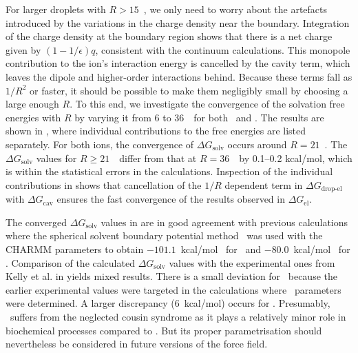 For larger droplets with $R > 15$~\angs, we only need to worry about the artefacts introduced by the 
variations in the charge density near the boundary. Integration of the charge density at the boundary 
region shows that there is a net charge given by $(1-1/\epsilon)q$, consistent with the continuum 
calculations. This monopole contribution to the ion's interaction energy is cancelled by the cavity 
term, which leaves the dipole and higher-order interactions behind. Because these terms fall as $1/R^2$ 
or faster, it should be possible to make them negligibly small by choosing a large enough $R$. To this 
end, we investigate the convergence of the solvation free energies with $R$ by varying it from 6 to 
36~\angs\ for both \Na\ and \Cl. The results are shown in , where individual 
contributions to the free energies are listed separately. For both ions, the convergence of $\Delta 
G_{\text{solv}}$ occurs around $R=21$~\angs. The $\Delta G_{\text{solv}}$ values for $R \geq 21$~\angs\ 
differ from that at $R=36$~\angs\ by 0.1--0.2 kcal/mol, which is within the statistical errors in the 
calculations. Inspection of the individual contributions in \tabref{solv:tab2} shows that cancellation 
of the $1/R$ dependent term in $\Delta G_{\text{drop-el}}$ with $\Delta G_{\text{cav}}$ ensures the 
fast convergence of the results observed in $\Delta G_{\text{el}}$.

The converged $\Delta G_{\text{solv}}$ values in  are in good agreement with previous 
calculations where the spherical solvent boundary potential method~\cite{Beglov1994} was used with the 
CHARMM parameters to obtain  $-101.1$~kcal/mol~\cite{Lin2014a} for \Na\ and 
$-80.0$~kcal/mol~\cite{Roux1996} for \Cl. Comparison of the calculated $\Delta G_{\text{solv}}$ 
values with the experimental ones from Kelly et al. in \tabref{solv:tab1} yields mixed results. There 
is a small deviation for \Na\ because the earlier experimental values were targeted in the calculations 
where \Na\ parameters were determined. A larger discrepancy (6~kcal/mol) occurs for \Cl. Presumably, 
\Cl\ suffers from the neglected cousin syndrome as it plays a relatively minor role in biochemical 
processes compared to \Na. But its proper parametrisation should nevertheless be considered in future 
versions of the force field.

